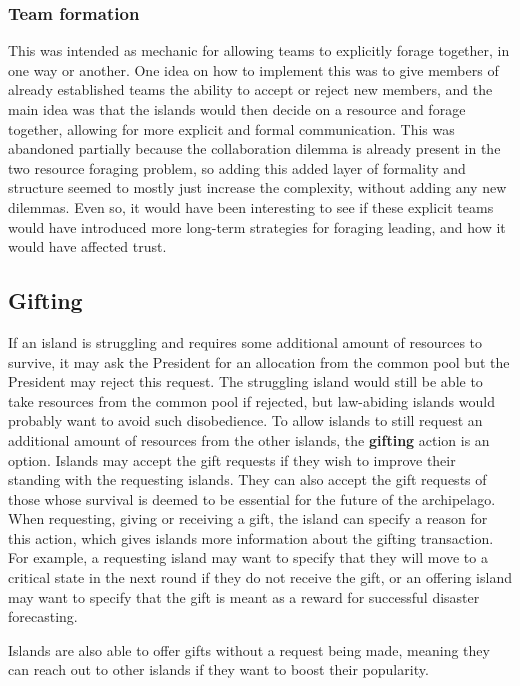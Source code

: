 \subsubsection{Team formation}
This was intended as mechanic for allowing teams to explicitly forage together, in one way or another. One idea on how to implement this was to give members of already established teams the ability to accept or reject new members, and the main idea was that the islands would then decide on a resource and forage together, allowing for more explicit and formal communication. This was abandoned partially because the collaboration dilemma is already present in the two resource foraging problem, so adding this added layer of formality and structure seemed to mostly just increase the complexity, without adding any new dilemmas. Even so, it would have been interesting to see if these explicit teams would have introduced more long-term strategies for foraging leading, and how it would have affected trust.

\subsection{Gifting}  
\label{subsec:IITO:gifting}  

If an island is struggling and requires some additional amount of resources to survive, it may ask the President for an allocation from the common pool but the President may reject this request. The struggling island would still be able to take resources from the common pool if rejected, but law-abiding islands would probably want to avoid such disobedience. To allow islands to still request an additional amount of resources from the other islands, the \textbf{gifting} action is an option. Islands may accept the gift requests if they wish to improve their standing with the requesting islands. They can also accept the gift requests of those whose survival is deemed to be essential for the future of the archipelago. When requesting, giving or receiving a gift, the island can specify a reason for this action, which gives islands more information about the gifting transaction. For example, a requesting island may want to specify that they will move to a critical state in the next round if they do not receive the gift, or an offering island may want to specify that the gift is meant as a reward for successful disaster forecasting.

Islands are also able to offer gifts without a request being made, meaning they can reach out to other islands if they want to boost their popularity.

